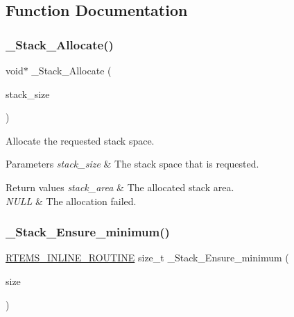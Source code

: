 \subsection{Function Documentation}
\mbox{\label{group__RTEMSScoreStack_gaa75b0bd2f7d99098ec726dbaa343cebe}} 
\subsubsection{\texorpdfstring{\_Stack\_Allocate()}{\_Stack\_Allocate()}}
{\footnotesize\ttfamily void$\ast$ \+\_\+\+Stack\+\_\+\+Allocate (\begin{DoxyParamCaption}\item[{size\+\_\+t}]{stack\+\_\+size }\end{DoxyParamCaption})}



Allocate the requested stack space. 


\begin{DoxyParams}{Parameters}
{\em stack\+\_\+size} & The stack space that is requested.\\
\hline
\end{DoxyParams}

\begin{DoxyRetVals}{Return values}
{\em stack\+\_\+area} & The allocated stack area. \\
\hline
{\em N\+U\+LL} & The allocation failed. \\
\hline
\end{DoxyRetVals}
\mbox{\label{group__RTEMSScoreStack_gaa4d28f2b60601a0713925707f4379743}} 
\subsubsection{\texorpdfstring{\_Stack\_Ensure\_minimum()}{\_Stack\_Ensure\_minimum()}}
{\footnotesize\ttfamily \mbox{\hyperlink{group__RTEMSScoreBaseDefs_gac216239df231d5dbd15e3520b0b9313f}{R\+T\+E\+M\+S\+\_\+\+I\+N\+L\+I\+N\+E\+\_\+\+R\+O\+U\+T\+I\+NE}} size\+\_\+t \+\_\+\+Stack\+\_\+\+Ensure\+\_\+minimum (\begin{DoxyParamCaption}\item[{size\+\_\+t}]{size }\end{DoxyParamCaption})}



